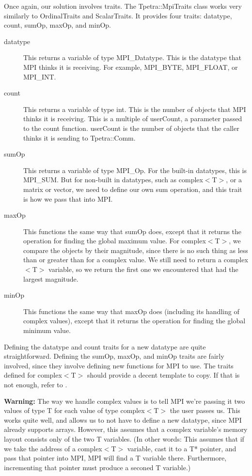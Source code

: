 \documentclass[10pt,relax]{TpetraDesign}
\begin{document}
Once again, our solution involves traits. The Tpetra::MpiTraits class works very similarly to OrdinalTraits and ScalarTraits. It provides four traits: datatype, count, sumOp, maxOp, and minOp.
\begin{description}

\item[datatype] This returns a variable of type MPI\_Datatype. This is the datatype that MPI thinks it is receiving. For example, MPI\_BYTE, MPI\_FLOAT, or MPI\_INT.

\item[count] This returns a variable of type int. This is the number of objects that MPI thinks it is receiving. This is a multiple of userCount, a parameter passed to the count function. userCount is the number of objects that the caller thinks it is sending to Tpetra::Comm.

\item[sumOp] This returns a variable of type MPI\_Op. For the built-in datatypes, this is MPI\_SUM. But for non-built in datatypes, such as complex$<$T$>$, or a matrix or vector, we need to define our own sum operation, and this trait is how we pass that into MPI.

\item[maxOp] This functions the same way that sumOp does, except that it returns the operation for finding the global maximum value. For complex$<$T$>$, we compare the objects by their magnitude, since there is no such thing as less than or greater than for a complex value. We still need to return a complex$<$T$>$ variable, so we return the first one we encountered that had the largest magnitude.

\item[minOp] This functions the same way that maxOp does (including its handling of complex values), except that it returns the operation for finding the global minimum value.
\end{description}

Defining the datatype and count traits for a new datatype are quite straightforward. Defining the sumOp, maxOp, and minOp traits are fairly involved, since they involve defining new functions for MPI to use. The traits defined for complex$<$T$>$ should provide a decent template to copy. If that is not enough, refer to \cite{MPI}.

\textbf{Warning:} The way we handle complex values is to tell MPI we're passing it two values of type T for each value of type complex$<$T$>$ the user passes us. This works quite well, and allows us to not have to define a new datatype, since MPI already supports arrays. However, this assumes that a complex variable's memory layout consists only of the two T variables. (In other words: This assumes that if we take the address of a complex$<$T$>$ variable, cast it to a T* pointer, and pass that pointer into MPI, MPI will find a T variable there. Furthermore, incrementing that pointer must produce a seconed T variable.) 
\end{document}
